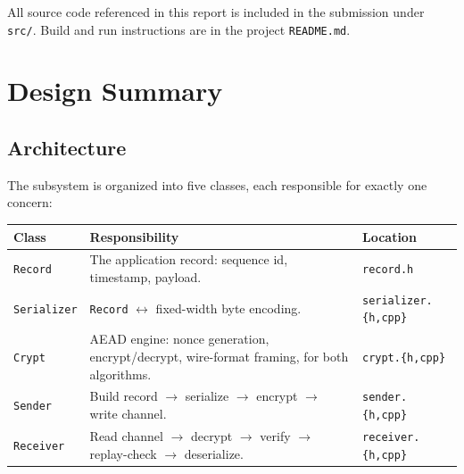 \documentclass[11pt]{article}
\begin{document}
All source code referenced in this report is included in the submission under
\texttt{src/}. Build and run instructions are in the project \texttt{README.md}.

\section{Design Summary}

\subsection{Architecture}

The subsystem is organized into five classes, each responsible for exactly one
concern:

\begin{center}
\begin{tabular}{@{}p{2.6cm}p{6.4cm}p{5.5cm}@{}}
\toprule
\textbf{Class} & \textbf{Responsibility} & \textbf{Location} \\
\midrule
\texttt{Record} & The application record: sequence id, timestamp, payload. & \texttt{record.h} \\
\texttt{Serializer} & \texttt{Record} $\leftrightarrow$ fixed-width byte encoding. & \texttt{serializer.\{h,cpp\}} \\
\texttt{Crypt} & AEAD engine: nonce generation, encrypt/decrypt, wire-format framing, for both algorithms. & \texttt{crypt.\{h,cpp\}} \\
\texttt{Sender} & Build record $\to$ serialize $\to$ encrypt $\to$ write channel. & \texttt{sender.\{h,cpp\}} \\
\texttt{Receiver} & Read channel $\to$ decrypt $\to$ verify $\to$ replay-check $\to$ deserialize. & \texttt{receiver.\{h,cpp\}} \\
\bottomrule
\end{tabular}
\end{center}
\end{document}
